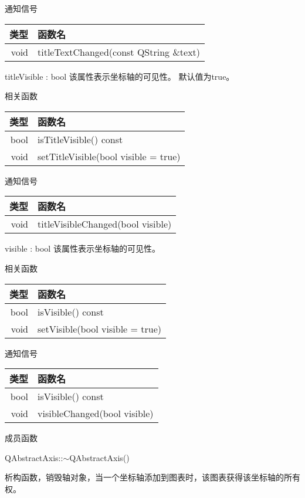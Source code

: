 通知信号

\begin{tabular}{|r|l|}
\hline
类型&函数名\\ 
\hline
void & titleTextChanged(const QString \&text)\\
\hline
\end{tabular}

\splitLine

titleVisible : bool 该属性表示坐标轴的可见性。 默认值为true。

相关函数

\begin{tabular}{|r|l|}
\hline
类型&函数名\\ 
\hline
bool & isTitleVisible() const\\
\hline
void & setTitleVisible(bool visible = true)\\
\hline
\end{tabular}

通知信号

\begin{tabular}{|r|l|}
\hline
类型&函数名\\ 
\hline
void & titleVisibleChanged(bool visible)\\
\hline
\end{tabular}

\splitLine

visible : bool 该属性表示坐标轴的可见性。

相关函数

\begin{tabular}{|r|l|}
\hline
类型&函数名\\ 
\hline
bool & isVisible() const\\
\hline
void & 	setVisible(bool visible = true)\\
\hline
\end{tabular}

通知信号

\begin{tabular}{|r|l|}
\hline
类型&函数名\\ 
\hline
bool & isVisible() const\\
\hline
void & 	visibleChanged(bool visible)\\
\hline
\end{tabular}

\splitLine

成员函数

QAbstractAxis::$\sim$QAbstractAxis() 

析构函数，销毁轴对象，当一个坐标轴添加到图表时，该图表获得该坐标轴的所有权。

